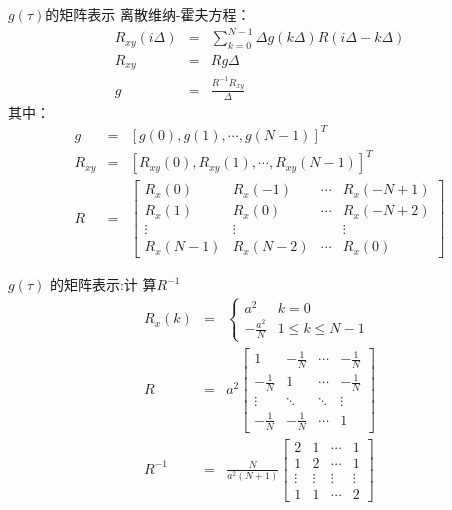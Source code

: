 \begin{frame}{$g(\tau)$的矩阵表示}
离散维纳-霍夫方程：
\begin{eqnarray*}
R_{xy}(i\Delta) &=& \sum_{k=0}^{N-1}\Delta g(k\Delta)R(i\Delta-k\Delta) \\
R_{xy} &=& R g\Delta  \\
g&=& \frac{R^{-1} R_{xy}}{ \Delta }
\end{eqnarray*}
其中：
\begin{eqnarray*}
g &=& [g(0),g(1),\cdots,g(N-1)]^T \\
R_{xy} &=& [R_{xy}(0),R_{xy}(1),\cdots,R_{xy}(N-1)]^T \\
R &=&
\begin{bmatrix}
R_x(0) & R_x(-1)  & \cdots & R_x(-N+1)  \\
R_x(1) & R_x(0)   & \cdots & R_x(-N+2)  \\
\vdots & \vdots   &        & \vdots     \\
R_x(N-1) & R_x(N-2)   & \cdots & R_x(0)  
\end{bmatrix}
\end{eqnarray*}
\end{frame}

\begin{frame}{$g(\tau)$ 的矩阵表示:计 算$R^{-1}$ }
\begin{eqnarray*}
R_x(k) &=&
\begin{cases}
a^2 & k=0  \\
-\frac{a^2}{N}  & 1\leq k \leq N-1
\end{cases} \\
R &=& a^2
\begin{bmatrix}
1 & -\frac{1}{N} & \cdots & -\frac{1}{N}  \\
-\frac{1}{N} & 1 & \cdots & -\frac{1}{N}  \\
\vdots & \ddots  & \ddots & \vdots \\
-\frac{1}{N} & -\frac{1}{N} & \cdots & 1 
\end{bmatrix} \\
R^{-1} &=& \frac{N}{a^2(N+1)}
\begin{bmatrix}
2 & 1 & \cdots & 1 \\
1 & 2 & \cdots & 1 \\
\vdots & \vdots & \vdots & \vdots \\
1 & 1 & \cdots  & 2
\end{bmatrix}
\end{eqnarray*}
\end{frame}

